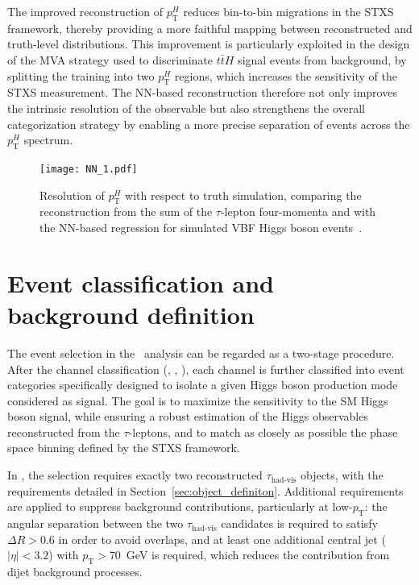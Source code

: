 The improved reconstruction of $p_{\text{T}}^H$ reduces bin-to-bin migrations in the STXS framework, thereby providing a more faithful mapping between reconstructed and truth-level distributions. This improvement is particularly exploited in the design of the MVA strategy used to discriminate $t\bar{t}H$ signal events from background, by splitting the training into two $p_{\text{T}}^H$ regions, which increases the sensitivity of the STXS measurement. The NN-based reconstruction therefore not only improves the intrinsic resolution of the observable but also strengthens the overall categorization strategy by enabling a more precise separation of events across the $p_{\text{T}}^H$ spectrum.

\begin{figure}[htbp]
    \centering
    \texttt{[image: NN\_1.pdf]}
    \caption{Resolution of $p_{\text{T}}^{H}$ with respect to truth simulation, comparing the reconstruction from the sum of the $\tau$-lepton four-momenta and \etmiss with the NN-based regression for simulated VBF Higgs boson events~\cite{differential_htautau}.}
    \label{fig:ptH_resolution}
\end{figure}

\section{Event classification and background definition}
\label{sec:event_selection_background}

The event selection in the \htautau\ analysis can be regarded as a two-stage procedure. 
After the channel classification (\tauemu, \taulephad, \tauhadhad), each channel is further classified into event categories specifically designed to isolate a given Higgs boson production mode considered as signal. 
The goal is to maximize the sensitivity to the SM Higgs boson signal, while ensuring a robust estimation of the Higgs observables reconstructed from the $\tau$-leptons, and to match as closely as possible the phase space binning defined by the STXS framework.

In \ttHtt, the selection requires exactly two reconstructed $\tau_{\text{had-vis}}$ objects, with the \pt requirements detailed in Section~\ref{sec:object_definiton}. 
Additional requirements are applied to suppress background contributions, particularly at low-$p_{\text{T}}$: the angular separation between the two $\tau_{\text{had-vis}}$ candidates is required to satisfy $\Delta R > 0.6$ in order to avoid overlaps, and at least one additional central jet ($|\eta| < 3.2$) with $p_{\text{T}} > 70$~GeV is required, which reduces the contribution from dijet background processes.

